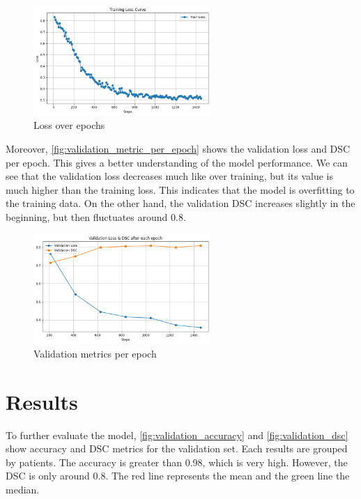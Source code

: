 \documentclass[11pt,a4paper]{article}
\begin{document}
\begin{figure}[H]
    \centering
    \includegraphics[width=0.6\textwidth]{./img/training_loss.png}
    \caption{Loss over epochs}
    \label{fig:training_loss}
\end{figure}

Moreover, \autoref{fig:validation_metric_per_epoch} shows the validation loss and DSC per epoch. This gives a better understanding of the model performance. We can see that the validation loss decreases much like over training, but its value is much higher than the training loss. This indicates that the model is overfitting to the training data. On the other hand, the validation DSC increases slightly in the beginning, but then fluctuates around 0.8.

\begin{figure}[H]
    \centering
    \includegraphics[width=0.6\textwidth]{./img/validation_metric_per_epoch.png}
    \caption{Validation metrics per epoch}
    \label{fig:validation_metric_per_epoch}
\end{figure}

\section{Results}
To further evaluate the model, \autoref{fig:validation_accuracy} and \autoref{fig:validation_dsc} show accuracy and DSC metrics for the validation set. Each results are grouped by patients. The accuracy is greater than 0.98, which is very high. However, the DSC is only around 0.8. The red line represents the mean and the green line the median.
\end{document}
